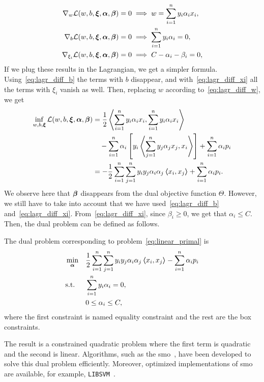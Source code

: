 \begin{align}
    \nabla_w \lagr(w, b, \fv{\xi}, \fv{\alpha}, \fv{\beta}) = 0 &\implies w = \sum_{i=1}^\nsamples y_i \alpha_i x_i , \label{eq:lagr_diff_w} \\
    \nabla_b \lagr(w, b, \fv{\xi}, \fv{\alpha}, \fv{\beta}) = 0 &\implies \sum_{i=1}^\nsamples y_i \alpha_i = 0, \label{eq:lagr_diff_b} \\
    \nabla_{\xi_i} \lagr(w, b, \fv{\xi}, \fv{\alpha}, \fv{\beta}) = 0 &\implies C - \alpha_i - \beta_i = 0 , \label{eq:lagr_diff_xi}
\end{align}
If we plug these results in the Lagrangian, we get a simpler formula. Using~\eqref{eq:lagr_diff_b} the terms with $b$ disappear, and with~\eqref{eq:lagr_diff_xi} all the terms with $\xi_i$ vanish as well. Then, replacing $w$ according to~\eqref{eq:lagr_diff_w}, we get 
\begin{equation}
    \nonumber
    \begin{aligned}
        \inf_{w, b, \bm{\xi}} \mathcal{L}(w, b, \bm{\xi}, \bm{\alpha}, \bm{\beta}) &= \frac{1}{2} \bm{\left\langle} \sum_{i=1}^n y_i \alpha_i x_i, \sum_{i=1}^n y_i \alpha_i x_i \bm{\right\rangle} \\
        &\quad- \sum_{i=1}^n \alpha_i \left[y_i \bm{\left\langle} \sum_{j=1}^n y_j \alpha_j x_j, x_i \bm{\right\rangle}  \right] + \sum_{i=1}^n \alpha_i p_i \\
        &= -\frac{1}{2} \sum_{i=1}^n \sum_{j=1}^n y_i y_j \alpha_i \alpha_j \bm{\left\langle} x_i, x_j \bm{\right\rangle} + \sum_{i=1}^n \alpha_i p_i .
    \end{aligned}
\end{equation}
We observe here that $\bm{\beta}$ disappears from the dual objective function $\Theta$. However, we still have to take into account that we have used~\eqref{eq:lagr_diff_b} and~\eqref{eq:lagr_diff_xi}. From~\eqref{eq:lagr_diff_xi}, since $\beta_i \geq 0$, we get that $\alpha_i \leq C$. Then, the dual problem can be defined as follows.
\begin{definition}
    The dual problem corresponding to problem~\eqref{eq:linear_primal} is
    \begin{equation}
        \label{eq:linear_dual}
        \begin{aligned}
            &\min_{\fv{\alpha}} & & \frac{1}{2} \sum_{i=1}^\nsamples \sum_{j=1}^\nsamples y_i y_j \alpha_i \alpha_j \dotp{x_i}{x_j} - \sum_{i=1}^\nsamples \alpha_i p_i \\
            & \text{s.t.} & & \sum_{i=1}^\nsamples y_i \alpha_i = 0 , \\
            & & & 0 \leq \alpha_i \leq C ,      
        \end{aligned}  
    \end{equation}
    where the first constraint is named equality constraint and the rest are the box constraints.
\end{definition}
The result is a constrained quadratic problem where the first term is quadratic and the second is linear. Algorithms, such as the \acrfull{smo}~\citep{KeerthiSBM01}, have been developed to solve this dual problem efficiently. Moreover, optimized implementations of \acrshort{smo} are available, for example, \texttt{LIBSVM}~\citep{ChangL11}.

